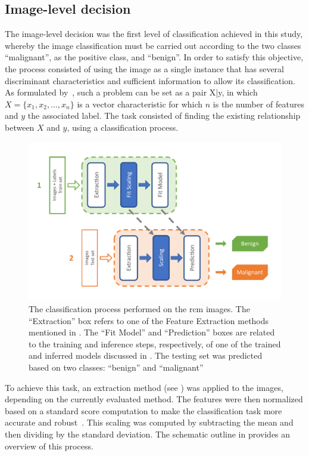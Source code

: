 \documentclass[journal,article,submit,moreauthors,pdftex, applsci]{Definitions/mdpi}
\begin{document}
\subsection{Image-level decision}
\label{sec:image_decision}
The image-level decision was the first level of classification achieved in this study, whereby the image classification must be carried out according to the two classes “malignant”, as the positive class, and “benign”. In order to satisfy this objective, the process consisted of using the image as a single instance that has several discriminant characteristics and sufficient information to allow its classification. As formulated by~\cite{foulds_frank_2010}, such a problem can be set as a pair {X|y}, in which \(X=\{x_1,x_2,\ldots,x_n\}\) is a vector characteristic for which \(n\) is the number of features and \(y\) the associated label. The task consisted of finding the existing relationship between \(X\) and \(y\), using a classification process.\par 
\begin{figure}[H]
    \begin{center}
        \includegraphics[width=0.7\linewidth]{Figures/Process_Image.pdf}
        \caption{The classification process performed on the \ac{rcm} images. The “Extraction” box refers to one of the Feature Extraction methods mentioned in . The “Fit Model” and “Prediction” boxes are related to the training and inference steps, respectively, of one of the trained and inferred models discussed in . The testing set was predicted based on two classes: “benign” and “malignant”}
        \label{fig:image_process}
    \end{center} 
\end{figure}\par
To achieve this task, an extraction method (see ) was applied to the images, depending on the currently evaluated method. The features were then normalized based on a standard score computation to make the classification task more accurate and robust~\cite{Graf2001}. This scaling was computed by subtracting the mean and then dividing by the standard deviation. The schematic outline in  provides an overview of this process.\par
\end{document}
